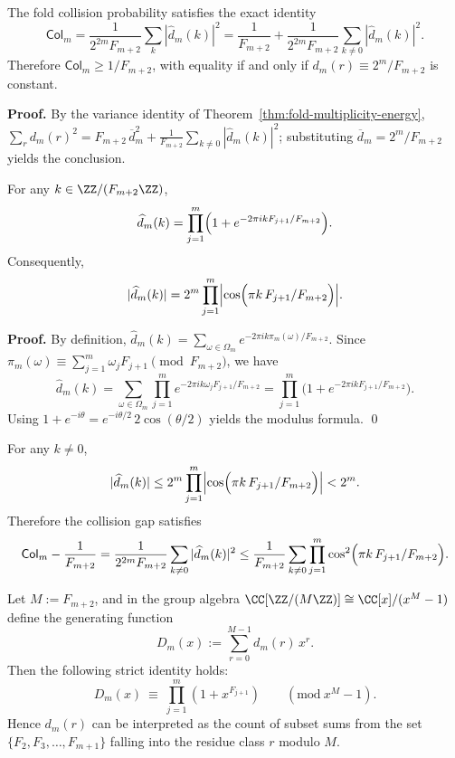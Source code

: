 \begin{theorem}
\label{thm:fold-collision-spectrum}
The fold collision probability satisfies the exact identity
\[
\mathsf{Col}_m
=\frac{1}{2^{2m}F_{m+2}}\sum_{k}|\widehat d_m(k)|^2
=\frac{1}{F_{m+2}}+\frac{1}{2^{2m}F_{m+2}}\sum_{k\ne 0}|\widehat d_m(k)|^2.
\]
Therefore $\mathsf{Col}_m\ge 1/F_{m+2}$, with equality if and only if $d_m(r)\equiv 2^m/F_{m+2}$ is constant.
\end{theorem}

\textbf{Proof.}
By the variance identity of Theorem~\ref{thm:fold-multiplicity-energy},
\(
\sum_r d_m(r)^2=F_{m+2}\,\overline d_m^2+\frac{1}{F_{m+2}}\sum_{k\ne 0}|\widehat d_m(k)|^2
\);
substituting $\overline d_m=2^m/F_{m+2}$ yields the conclusion.

\begin{theorem}
\label{thm:fold-spectrum-factorization}
For any $k\in\ZZ/(F_{m+2}\ZZ)$,
\[
\widehat d_m(k)=\prod_{j=1}^m\Bigl(1+e^{-2\pi i k F_{j+1}/F_{m+2}}\Bigr).
\]
Consequently,
\[
|\widehat d_m(k)|=2^m\prod_{j=1}^m\Bigl|\cos\Bigl(\pi k\,F_{j+1}/F_{m+2}\Bigr)\Bigr|.
\]
\end{theorem}

\textbf{Proof.}
By definition,
\(
\widehat d_m(k)=\sum_{\omega\in\Omega_m}e^{-2\pi i k\pi_m(\omega)/F_{m+2}}
\).
Since $\pi_m(\omega)\equiv \sum_{j=1}^m \omega_j F_{j+1}\pmod{F_{m+2}}$, we have
\[
\widehat d_m(k)=\sum_{\omega\in\Omega_m}\prod_{j=1}^m e^{-2\pi i k\omega_j F_{j+1}/F_{m+2}}
=\prod_{j=1}^m\bigl(1+e^{-2\pi i k F_{j+1}/F_{m+2}}\bigr).
\]
Using $1+e^{-i\theta}=e^{-i\theta/2}\,2\cos(\theta/2)$ yields the modulus formula. \qed

\begin{corollary}
\label{cor:fold-spectrum-nontrivial-bound}
For any $k\ne 0$,
\[
|\widehat d_m(k)|\le 2^m\prod_{j=1}^m\Bigl|\cos\Bigl(\pi k\,F_{j+1}/F_{m+2}\Bigr)\Bigr|<2^m.
\]
Therefore the collision gap satisfies
\[
\mathsf{Col}_m-\frac{1}{F_{m+2}}=\frac{1}{2^{2m}F_{m+2}}\sum_{k\ne 0}|\widehat d_m(k)|^2
\le\frac{1}{F_{m+2}}\sum_{k\ne 0}\prod_{j=1}^m\cos^2\Bigl(\pi k\,F_{j+1}/F_{m+2}\Bigr).
\]
\end{corollary}

\begin{proposition}\label{prop:fold-multiplicity-group-algebra}
Let \(M:=F_{m+2}\), and in the group algebra
\(
\CC[\ZZ/(M\ZZ)]\cong \CC[x]/(x^{M}-1)
\)
define the generating function
\[
D_m(x):=\sum_{r=0}^{M-1} d_m(r)\,x^r.
\]
Then the following strict identity holds:
\[
\boxed{\;
D_m(x)\ \equiv\ \prod_{j=1}^{m}\left(1+x^{F_{j+1}}\right)\qquad(\mathrm{mod}\ x^{M}-1).\;}
\]
Hence \(d_m(r)\) can be interpreted as the count of subset sums from the set \(\{F_{2},F_{3},\dots,F_{m+1}\}\) falling into the residue class \(r\) modulo \(M\).
\end{proposition}

